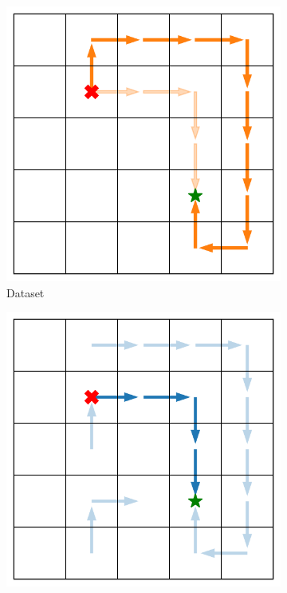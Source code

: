 \documentclass{article} %
\begin{document}
\begin{figure}[t]
\begin{minipage}{0.48\textwidth}
\begin{subfigure}[c]{0.32\linewidth}
                \includegraphics[width=\linewidth]{figures/policy_analysis/shortcut_searching_single_dataset.pdf}
                \caption*{Dataset}
            \end{subfigure}
            \hfill
            \begin{subfigure}[c]{0.32\linewidth}
                \includegraphics[width=\linewidth]{figures/policy_analysis/shortcut_searching_single_td_infonce.pdf}

\end{subfigure}
\end{minipage}
\end{figure}
\end{document}
